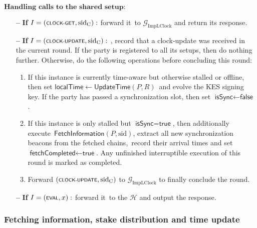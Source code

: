 \begin{protocol}
\begin{algorithmic}
        \State $\textbf{Handling calls to the shared setup:}$
        \begin{itemize}
            \item[\textbf{--}] \textbf{If} $I = (\textsf{\scriptsize{CLOCK-GET}}, \text{sid}_\text{C}):$ forward it\
            to $\mathcal{G}_{\text{ImpLClock}}$ and return its response.
            \item[\textbf{--}] \textbf{If} $I = (\textsf{\scriptsize{CLOCK-UPDATE}}, \text{sid}_\text{C}):$ ,  record that a clock-update was received in the current round.
            If the party is registered to all its setups,  then do nothing further.
            Otherwise,  do the following operations before concluding this round:
            \begin{enumerate}
                \item If this instance is currently time-aware but otherwise stalled or offline, then set $\textsf{localTime} \leftarrow \textsf{UpdateTime}(P, R)$\
                and evolve the KES signing key.
                If the party has passed a synchronization slot, then set $\textsf{isSync}  \leftarrow  \textsf{false}$.
                \item If this instance is only stalled but $\textsf{isSync}  =  \textsf{true}$, then additionally execute\
                \hyperref[apndx:fetch-info-protocol]{$\textsf{FetchInformation}$}$(P, \text{sid})$, extract all new synchronization beacons from the fetched chains,\
                record their arrival times and set $\textsf{fetchCompleted}  \leftarrow  \textsf{true}$.
                Any unfinished interruptible execution of this round is marked as completed.
                \item Forward $(\textsf{\scriptsize{CLOCK-UPDATE}}, \text{sid}_\text{C})$ to $\mathcal{G}_{\text{ImpLClock}}$ to finally conclude the round.
            \end{enumerate}
            \item[\textbf{--}] \textbf{If} $I = (\textsf{\scriptsize{EVAL}}, x):$ forward it\
            to the $\mathcal{H}$ and output the response.
        \end{itemize}


    \end{algorithmic}\label{alg:spectrum-protocol}
\end{protocol}

\subsubsection{Fetching information, stake distribution and time update}


